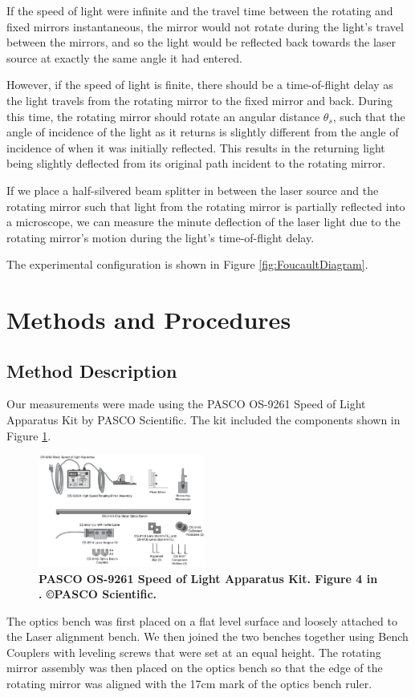 \documentclass[twocolumn]{article}
\begin{document}
		If the speed of light were infinite and the travel time between the rotating and fixed mirrors instantaneous, the mirror would not rotate during the light's travel between the mirrors, and so the light would be reflected back towards the laser source at exactly the same angle it had entered.
		
		However, if the speed of light is finite, there should be a time-of-flight delay as the light travels from the rotating mirror to the fixed mirror and back.
		During this time, the rotating mirror should rotate an angular distance $\theta_s$, such that the angle of incidence of the light as it returns is slightly different from the angle of incidence of when it was initially reflected.
		This results in the returning light being slightly deflected from its original path incident to the rotating mirror.
		
		If we place a half-silvered beam splitter in between the laser source and the rotating mirror such that light from the rotating mirror is partially reflected into a microscope, we can measure the minute deflection of the laser light due to the rotating mirror's motion during the light's time-of-flight delay.
		
		The experimental configuration is shown in Figure \ref{fig:FoucaultDiagram}.
		
\section{Methods and Procedures}
	\label{sec:Methods}
	\subsection{Method Description}
		Our measurements were made using the PASCO OS-9261 Speed of Light Apparatus Kit by PASCO Scientific.
		The kit included the components shown in Figure \ref{fig:LabEquip}.
		\begin{figure}[!ht]
			\centering
			\includegraphics[width=0.49\textwidth]{Images/PASCO_Equipment.png}
			\caption{\textbf{PASCO OS-9261 Speed of Light Apparatus Kit. Figure 4 in \cite{lee_instruction_????}. \copyright PASCO Scientific.}}
			\label{fig:LabEquip}
		\end{figure}
		The optics bench was first placed on a flat level surface and loosely attached to the Laser alignment bench.  
		We then joined the two benches together using Bench Couplers with leveling screws that were set at an equal height.  
		The rotating mirror assembly was then placed on the optics bench so that the edge of the rotating mirror was aligned with the 17cm mark of the optics bench ruler.
		
\end{document}
